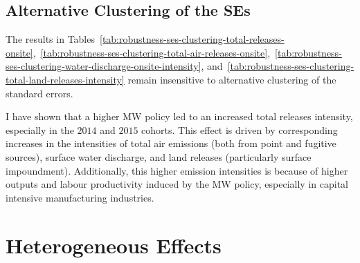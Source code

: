 \documentclass{C:/Users/david/OneDrive/Documents/ULMS/PhD/Thesis/chapter3/src/climate_change/latex/Economic_Journal/OUP-EJ}
\begin{document}
    \subsection{Alternative Clustering of the SEs}\label{subsec:alternative-clustering-of-the-ses}
    The results in Tables~\ref{tab:robustness-ses-clustering-total-releases-onsite},~\ref{tab:robustness-ses-clustering-total-air-releases-onsite},~\ref{tab:robustness-ses-clustering-water-discharge-onsite-intensity}, and~\ref{tab:robustness-ses-clustering-total-land-releases-intensity} remain insensitive to alternative clustering of the standard errors.
    
    
    
    

    I have shown that a higher MW policy led to an increased total releases intensity, especially in the $2014$ and $2015$ cohorts. This effect is driven by corresponding increases in the intensities of total air emissions (both from point and fugitive sources), surface water discharge, and land releases (particularly surface impoundment). Additionally, this higher emission intensities is because of higher outputs and labour productivity induced by the MW policy, especially in capital intensive manufacturing industries.


    \section{Heterogeneous Effects}\label{sec:heterogeneous-effects}
\end{document}
